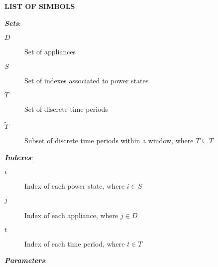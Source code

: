 \newpage

\begin{center}
  \large{\textbf{LIST OF SIMBOLS}}
\end{center}


\noindent \emph{\textbf{Sets}}:


\vspace{4pt}

\begin{description}
    \item [{$D$}]           Set of appliances
    \item [{$S$}]           Set of indexes associated to power states
    \item [{$T$}]           Set of discrete time periods
    \item [{$\tilde{T}$}]   Subset of discrete time periods within a window, where $\tilde{T} \subseteq T$

\end{description}

\vspace{4pt}

\noindent \emph{\textbf{Indexes}}:

\vspace{4pt}

\begin{description}
    \item [{$i$}]   Index of each power state, where $i \in S$
    \item [{$j$}]   Index of each appliance, where $j \in D$
    \item [{$t$}]   Index of each time period, where $t \in T$

\end{description}

\vspace{4pt}

\noindent \emph{\textbf{Parameters}}:

\vspace{4pt}

